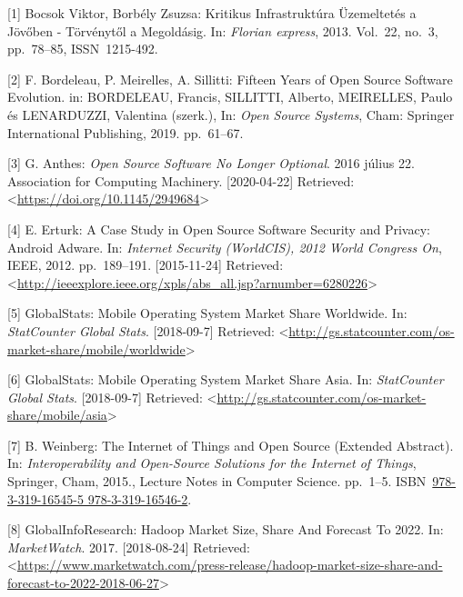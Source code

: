 \documentclass[12pt,magyar,a4paper,oneside]{scrreprt}
\newenvironment{cslreferences}%
  {}%
  {\par}
\begin{document}
\hypertarget{refs}{}
\begin{cslreferences}
\leavevmode\hypertarget{ref-bocsok_viktor_kritikus_2013}{}%
{[}1{]} Bocsok Viktor, Borbély Zsuzsa: Kritikus Infrastruktúra
Üzemeltetés a Jövőben - Törvénytől a Megoldásig. In: \emph{Florian
express}, 2013. Vol.~22, no.~3, pp.~78--85, ISSN~1215-492.

\leavevmode\hypertarget{ref-bordeleau_fifteen_2019}{}%
{[}2{]} F. Bordeleau, P. Meirelles, A. Sillitti: Fifteen Years of Open
Source Software Evolution. in: BORDELEAU, Francis, SILLITTI, Alberto,
MEIRELLES, Paulo és LENARDUZZI, Valentina (szerk.), In: \emph{Open
Source Systems}, Cham: Springer International Publishing, 2019.
pp.~61--67.

\leavevmode\hypertarget{ref-anthes_open_2016}{}%
{[}3{]} G. Anthes: \emph{Open Source Software No Longer Optional}. 2016
július 22. Association for Computing Machinery. {[}2020-04-22{]}
Retrieved:
\textless{}\url{https://doi.org/10.1145/2949684}\textgreater{}

\leavevmode\hypertarget{ref-erturk_case_2012}{}%
{[}4{]} E. Erturk: A Case Study in Open Source Software Security and
Privacy: Android Adware. In: \emph{Internet Security (WorldCIS), 2012
World Congress On}, IEEE, 2012. pp.~189--191. {[}2015-11-24{]}
Retrieved:
\textless{}\url{http://ieeexplore.ieee.org/xpls/abs_all.jsp?arnumber=6280226}\textgreater{}

\leavevmode\hypertarget{ref-globalstats_mobile_nodate}{}%
{[}5{]} GlobalStats: Mobile Operating System Market Share Worldwide. In:
\emph{StatCounter Global Stats}. {[}2018-09-7{]} Retrieved:
\textless{}\url{http://gs.statcounter.com/os-market-share/mobile/worldwide}\textgreater{}

\leavevmode\hypertarget{ref-globalstats_mobile_nodate-1}{}%
{[}6{]} GlobalStats: Mobile Operating System Market Share Asia. In:
\emph{StatCounter Global Stats}. {[}2018-09-7{]} Retrieved:
\textless{}\url{http://gs.statcounter.com/os-market-share/mobile/asia}\textgreater{}

\leavevmode\hypertarget{ref-weinberg_internet_2015}{}%
{[}7{]} B. Weinberg: The Internet of Things and Open Source (Extended
Abstract). In: \emph{Interoperability and Open-Source Solutions for the
Internet of Things}, Springer, Cham, 2015., Lecture Notes in Computer
Science. pp.~1--5.
ISBN~\href{https://worldcat.org/isbn/978-3-319-16545-5\%20978-3-319-16546-2}{978-3-319-16545-5 978-3-319-16546-2}.

\leavevmode\hypertarget{ref-globalinforesearch_hadoop_2017}{}%
{[}8{]} GlobalInfoResearch: Hadoop Market Size, Share And Forecast To
2022. In: \emph{MarketWatch}. 2017. {[}2018-08-24{]} Retrieved:
\textless{}\url{https://www.marketwatch.com/press-release/hadoop-market-size-share-and-forecast-to-2022-2018-06-27}\textgreater{}


\end{cslreferences}
\end{document}
